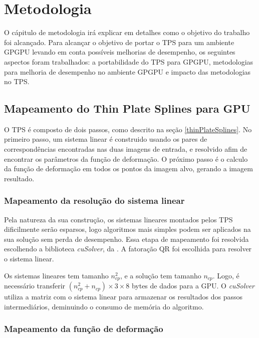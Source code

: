 \chapter{Metodologia}
\label{cap:metodologia}

  O cápitulo de metodologia irá explicar em detalhes como o objetivo do trabalho
foi alcançado. Para alcançar o objetivo de portar o TPS para um ambiente GPGPU
levando em conta possíveis melhorias de desempenho, os seguintes aspectos foram
trabalhados: a portabilidade do TPS para GPGPU, metodologias para melhoria de
desempenho no ambiente GPGPU e impacto das metodologias no TPS.

\section{Mapeamento do Thin Plate Splines para GPU}

  O TPS é composto de dois passos, como descrito na seção \ref{thinPlateSplines}.
No primeiro passo, um sistema linear é construido usando os pares de correspondências
encontradas nas duas imagens de entrada, e resolvido afim de encontrar os parâmetros
da função de deformação. O próximo passo é o calculo da função de deformação em
todos os pontos da imagem alvo, gerando a imagem resultado.

\subsection{Mapeamento da resolução do sistema linear}

  Pela natureza da sua construção, os sistemas lineares montados pelos TPS dificilmente
serão esparsos, logo algoritmos mais simples podem ser aplicados na sua solução
sem perda de desempenho. Essa etapa de mapeamento foi resolvida escolhendo a
biblioteca \textit{cuSolver}, da \cite{cuSolver}. A fatoração QR foi escolhida
para resolver o sistema linear.

  Os sistemas lineares tem tamanho $n_{cp}^2$, e a solução tem tamanho $n_{cp}$.
Logo, é necessário transferir $(n_{cp}^2 + n_{cp}) \times 3 \times 8$ bytes de
dados para a GPU. O \textit{cuSolver} utiliza a matriz com o sistema linear para
armazenar os resultados dos passos intermediários, deminuindo o consumo de memória
do algoritmo.

\subsection{Mapeamento da função de deformação}\label{segundoPasso}

